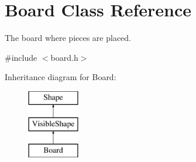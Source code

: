 \hypertarget{class_board}{}\section{Board Class Reference}
\label{class_board}


The board where pieces are placed.  




{\ttfamily \#include $<$board.\+h$>$}

Inheritance diagram for Board\+:\begin{figure}[H]
\begin{center}
\leavevmode
\includegraphics[height=3.000000cm]{class_board}
\end{center}
\end{figure}
